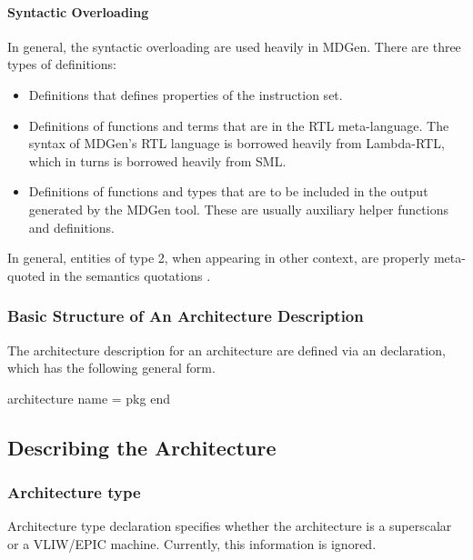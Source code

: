 \paragraph{Syntactic Overloading}
In general, the syntactic overloading are used heavily in MDGen.
There are three types of definitions:
\begin{itemize}
 \item Definitions that defines properties of the instruction set.
 \item Definitions of functions and terms that are in the RTL meta-language.
The syntax of MDGen's RTL language is borrowed heavily from Lambda-RTL, 
which in turns is borrowed heavily from SML.
 \item Definitions of functions and types that are to be included in the
output generated by the MDGen tool.  These are usually auxiliary
helper functions and definitions.
\end{itemize}
In general, entities of type 2, when appearing in other context, are
properly meta-quoted in the semantics quotations \sml{[[ ]]}.

\subsubsection{Basic Structure of An Architecture Description}

   The architecture description for an architecture are defined via
an  declaration, which has the following general
form.

\begin{SML}
architecture name =
pkg
end
\end{SML}

\subsection{Describing the Architecture} 

\subsubsection{Architecture type}
  Architecture type declaration specifies whether the architecture is
a superscalar or a VLIW/EPIC machine.  Currently, this information is
ignored.

